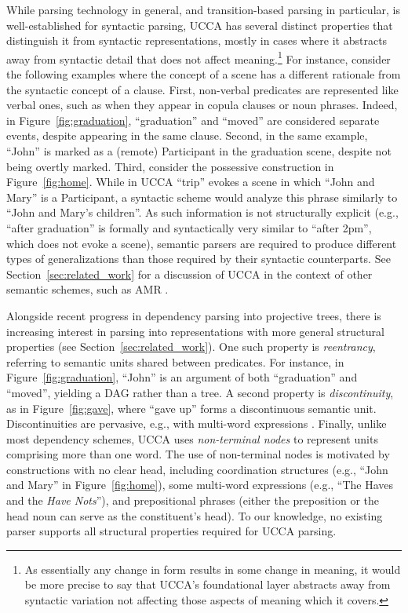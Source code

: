 \documentclass[11pt,a4paper]{article}
\newcommand{\secref}[1]{Section~\ref{#1}}
\newcommand{\figref}[1]{Figure~\ref{#1}}
\begin{document}
While parsing technology in general, and transition-based parsing in particular,
is well-established for syntactic parsing, UCCA
has several distinct properties
that distinguish it from syntactic representations, mostly in cases where it
abstracts away from syntactic detail that does not
affect meaning.\footnote{As essentially any change in form results
in some change in meaning, it would be more precise to say that
UCCA's foundational layer abstracts away from syntactic variation
not affecting those aspects of meaning which it covers.}
For instance, consider the following examples where the concept of a scene
has a different rationale from the syntactic concept of a clause.
First, non-verbal predicates are represented like verbal ones,
such as when they appear in copula clauses or noun phrases. Indeed,
in \figref{fig:graduation}, ``graduation'' and ``moved'' are considered separate events,
despite appearing in the same clause. 
Second, in the same example, ``John'' is marked as a (remote) Participant
in the graduation scene, despite not being overtly marked.
Third, consider the possessive construction in \figref{fig:home}.
While in UCCA ``trip'' evokes a scene in which ``John and Mary'' is
a Participant, a syntactic scheme would analyze this phrase similarly to ``John and Mary's children''.
As such information is not structurally explicit
(e.g., ``after graduation'' is formally and syntactically very similar to ``after 2pm'',
which does not evoke a scene), semantic parsers are required to produce
different types of generalizations than those required by their syntactic counterparts.
See \secref{sec:related_work} for a discussion of UCCA in the context of other semantic schemes,
such as AMR \cite{banarescu2013abstract}.


Alongside recent progress in dependency parsing into projective trees,
there is increasing interest in parsing into 
representations with more general structural properties  (see \secref{sec:related_work}).
One such property is \textit{reentrancy},
referring to semantic units shared between predicates.
For instance, in \figref{fig:graduation},
``John'' is an argument of both ``graduation''
and ``moved'', yielding a DAG rather than a tree.
A second property is \textit{discontinuity},
as in \figref{fig:gave}, where ``gave up'' forms a discontinuous semantic unit.
Discontinuities are pervasive, e.g.,  with multi-word
expressions \cite{schneider2014discriminative}.
Finally, unlike most dependency schemes, UCCA uses \textit{non-terminal nodes}
to represent units comprising more than one word.
The use of non-terminal nodes is motivated by constructions with no clear head, including
coordination structures (e.g., ``John and Mary'' in \figref{fig:home}),
some multi-word expressions (e.g., ``The Haves and the \textit{Have Nots}''),
and prepositional phrases (either the preposition or the head noun can serve as the constituent's head).
To our knowledge, no existing parser supports all structural properties required for UCCA
parsing.
\end{document}
